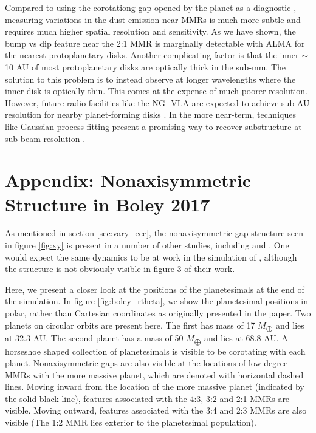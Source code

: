 \documentclass[twocolumn]{aastex63}
\begin{document}
Compared to using the corotationg gap opened by the planet as a diagnostic \citep{2013ApJ...777L..31D, 2016ApJ...820...29D}, measuring 
variations in the dust emission near MMRs is much more subtle and requires much higher spatial resolution and sensitivity. As we have shown, the 
bump vs dip feature near the 2:1 MMR is marginally detectable with ALMA for the nearest protoplanetary disks. Another complicating factor is that 
the inner $\sim$ 10 AU of most protoplanetary disks are optically thick in the sub-mm. The solution to this problem is to instead observe at longer 
wavelengths where the inner disk is optically thin. This comes at the expense of much poorer resolution. However, future radio facilities like the NG-
VLA are expected to achieve sub-AU resolution for nearby planet-forming disks \citep{2018ASPC..517..147R}. In the more near-term, techniques 
like Gaussian process fitting present a promising way to recover substructure at sub-beam resolution \citep{2020arXiv200507709J}.



\clearpage

\section{Appendix: Nonaxisymmetric Structure in Boley 2017}\label{sec:boley_plot}

As mentioned in section \ref{sec:vary_ecc}, the nonaxisymmetric gap structure seen in figure \ref{fig:xy} is present in a number of other studies,
including \citet{2000Icar..143...45R} and \citet{2016ApJ...818..159T}. One would expect the same dynamics to be at work in the simulation of 
\citet{2017ApJ...850..103B}, although the structure is not obviously visible in figure 3 of their work.

Here, we present a closer look at the positions of the planetesimals at the end of the \citet{2017ApJ...850..103B} simulation. In figure 
\ref{fig:boley_rtheta}, we show the planetesimal positions in polar, rather than Cartesian coordinates as originally presented in the paper. Two planets 
on circular orbits are present here. The first has mass of 17 $M_{\bigoplus}$ and lies at 32.3 AU. The second planet has a mass of 50 $M_{\bigoplus}$ 
and lies at 68.8 AU. A horseshoe shaped collection of planetesimals is visible to be corotating with each planet. Nonaxisymmetric gaps are also
visible at the locations of low degree MMRs with the more massive planet, which are denoted with horizontal dashed lines. Moving inward from the 
location of the more massive planet (indicated by the solid black line), features associated with the 4:3, 3:2 and 2:1 MMRs are visible. Moving 
outward, features associated with the 3:4 and 2:3 MMRs are also visible (The 1:2 MMR lies exterior to the planetesimal population).
\end{document}
